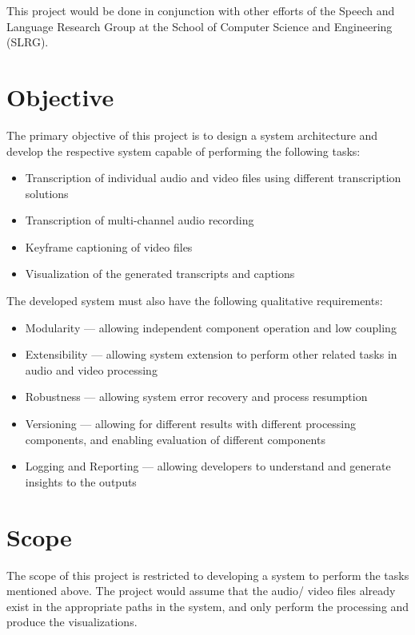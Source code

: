 This project would be done in conjunction with other efforts of the Speech and
Language Research Group at the School of Computer Science and Engineering
(SLRG)\cite{slrg}.

\section{Objective}\label{sec:in:obj}

The primary objective of this project is to design a system architecture and
develop the respective system capable of performing the following tasks:

\begin{itemize}
    \item Transcription of individual audio and video files using different
    transcription solutions
    \item Transcription of multi-channel audio recording
    \item Keyframe captioning of video files
    \item Visualization of the generated transcripts and captions
\end{itemize}

The developed system must also have the following qualitative requirements:

\begin{itemize}
    \item Modularity --- allowing independent component operation and low coupling
    \item Extensibility --- allowing system extension to perform other related
    tasks in audio and video processing
    \item Robustness --- allowing system error recovery and process resumption
    \item Versioning --- allowing for different results with different processing
    components, and enabling evaluation of different components
    \item Logging and Reporting --- allowing developers to understand and generate
    insights to the outputs
\end{itemize}

\section{Scope}\label{sec:in:sco}

The scope of this project is restricted to developing a system to perform the
tasks mentioned above. The project would assume that the audio/ video files
already exist in the appropriate paths in the system, and only perform the
processing and produce the visualizations.

